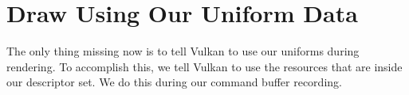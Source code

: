 \section{Draw Using Our Uniform Data}

The only thing missing now is to tell Vulkan to use our uniforms during rendering.
To accomplish this, we tell Vulkan to use the resources that are inside
our descriptor set.
We do this during our command buffer recording.

\begin{minipage}{\linewidth}{\noindent}
    
\end{minipage}
